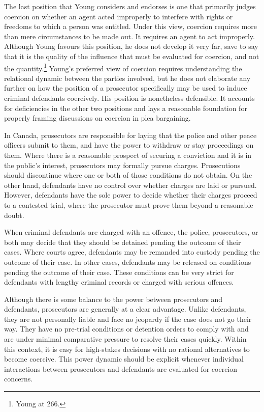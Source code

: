 The last position that Young considers and endorses is one that primarily judges coercion on whether an agent acted improperly to interfere with rights or freedoms to which a person was entitled. Under this view, coercion requires more than mere circumstances to be made out. It requires an agent to act improperly. Although Young favours this position, he does not develop it very far, save to say that it is the quality of the influence that must be evaluated for coercion, and not the quantity.\footnote{Young at 266.} Young's preferred view of coercion requires understanding the relational dynamic between the parties involved, but he does not elaborate any further on how the position of a prosecutor specifically may be used to induce criminal defendants coercively. His position is nonetheless defensible. It accounts for deficiencies in the other two positions and lays a reasonable foundation for properly framing discussions on coercion in plea bargaining.

In Canada, prosecutors are responsible for laying that the police and other peace officers submit to them, and have the power to withdraw or stay proceedings on them. Where there is a reasonable prospect of securing a conviction and it is in the public's interest, prosecutors may formally pursue charges. Prosecutions should discontinue where one or both of those conditions do not obtain. On the other hand, defendants have no control over whether charges are laid or pursued. However, defendants have the sole power to decide whether their charges proceed to a contested trial, where the prosecutor must prove them beyond a reasonable doubt.

When criminal defendants are charged with an offence, the police, prosecutors, or both may decide that they should be detained pending the outcome of their cases. Where courts agree, defendants may be remanded into custody pending the outcome of their case. In other cases, defendants may be released on conditions pending the outcome of their case. These conditions can be very strict for defendants with lengthy criminal records or charged with serious offences.

Although there is some balance to the power between prosecutors and defendants, prosecutors are generally at a clear advantage. Unlike defendants, they are not personally liable and face no jeopardy if the case does not go their way. They have no pre-trial conditions or detention orders to comply with and are under minimal comparative pressure to resolve their cases quickly. Within this context, it is easy for high-stakes decisions with no rational alternatives to become coercive. This power dynamic should be explicit whenever individual interactions between prosecutors and defendants are evaluated for coercion concerns.

